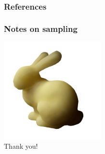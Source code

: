 \documentclass{beamer}
\begin{document}
\begin{frame}
    \frametitle{References}
 
\end{frame}

\begin{frame}
    \frametitle{Notes on sampling}
\centering
\includegraphics[width=0.4\textwidth]{front} \\
\huge Thank you!
\end{frame}
\end{document}
